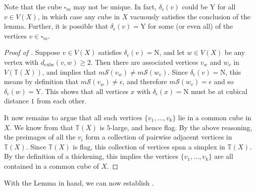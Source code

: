 \documentclass[12pt, letterpaper]{article}
\theoremstyle{plain}
\theoremstyle{definition}
\begin{document}
Note that the cube $\square_m$ may not be unique. In fact, $\delta_{\epsilon}(v)$ could be $\text{Y}$ for all $v \in V(X)$, in which case any cube in $X$ vacuously satisfies the conclusion of the lemma. Further, it is possible that $\delta_{\epsilon}(v) = \text{Y}$ for some (or even all) of the vertices $v \in \square_m$.

\begin{proof}[Proof of ]
Suppose $v \in V(X)$ satisfies $\delta_\epsilon(v) = \text{N}$, and let $w \in V(X)$ be any vertex with $d_{\text{cube}}(v,w) \geq 2$. Then there are associated vertices $v_w$ and $w_v$ in $V(\mathbb{T}(X))$, and  implies that $m \mathcal{S}(v_w) \neq m \mathcal{S}(w_v)$. Since $\delta_\epsilon(v) = \text{N}$, this means by definition that $m \mathcal{S} (v_w) \neq \epsilon$, and therefore $m \mathcal{S} (w_v) = \epsilon$ and so $\delta_{\epsilon}(w) = \text{Y}$. This shows that all vertices $x$ with $\delta_\epsilon(x) = \text{N}$ must be at cubical distance $1$ from each other.

It now remains to argue that all such vertices $\{v_1, \ldots , v_k\}$ lie in a common cube in $X$. We know from  that $\mathbb{T}(X)$ is $5$-large, and hence flag. By the above reasoning, the preimages of all the $v_i$ form a collection of pairwise adjacent vertices in $\mathbb{T}(X)$. Since $\mathbb{T}(X)$ is flag, this collection of vertices span a simplex in $\mathbb{T}(X)$. By the definition of a thickening, this implies the vertices $\{v_1, \ldots , v_k\}$ are all contained in a common cube of $X$.
\end{proof}

With the Lemma in hand, we can now establish .
\end{document}
